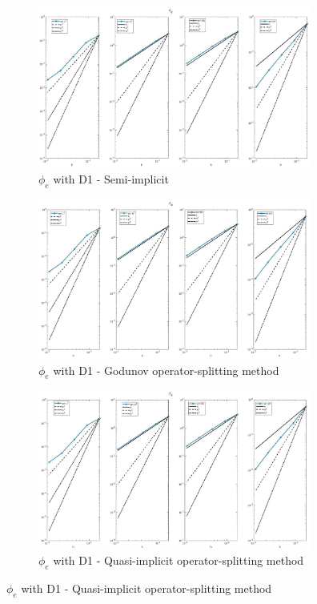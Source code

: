 \documentclass[a4paper,11pt]{article}
\begin{document}
\begin{figure} \captionsetup{size = large} \caption{Comparison of $\phi_e$ and $w$ errors between different time-discretization schemes} \label{pe-time}
\begin{subfigure}{0.5\textwidth}
\includegraphics[width = 9cm]{./D1_Phie_1.jpg}
\caption*{$\phi_e$ with D1 - Semi-implicit}
\end{subfigure}
\begin{subfigure}{0.5\textwidth}
\includegraphics[width =9cm]{./D1_Phie_1_GO.jpg}
\caption*{$\phi_e$ with D1 - Godunov operator-splitting method}
\end{subfigure}
\begin{center}
\begin{subfigure}{0.5\textwidth}
\includegraphics[width =9cm]{./D1_Phie_1_OS.jpg}
\caption*{$\phi_e$ with D1 - Quasi-implicit operator-splitting method}
\end{subfigure}
\end{center}

\end{figure}
\end{document}
